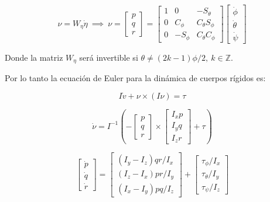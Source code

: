 \documentclass[../main.tex]{subfiles}
\begin{document}
\begin{equation}
\nu=W_{\eta}\dot{\eta}\ \implies\ \nu=\begin{bmatrix}p\\
q\\
r
\end{bmatrix}=\begin{bmatrix}1 & 0 & -S_{\theta}\\
0 & C_{\phi} & C_{\theta}S_{\phi}\\
0 & -S_{\phi} & C_{\theta}C_{\phi}
\end{bmatrix}\begin{bmatrix}\dot{\phi}\\
\dot{\theta}\\
\dot{\psi}
\end{bmatrix}\label{eq:138}
\end{equation}

Donde la matriz $W_{\eta}$ será invertible si $\theta\neq(2k-1)\phi/2,\ k\in\mathbb{Z}.$ 

Por lo tanto la ecuación de Euler para la dinámica de cuerpos rígidos
es:

\begin{equation}
I\dot{v}+\nu\times(I\nu)=\tau
\end{equation}

\begin{equation}
\dot{\nu}=I^{-1}\left(-\begin{bmatrix}p\\
q\\
r
\end{bmatrix}\times\begin{bmatrix}I_{x}p\\
I_{y}q\\
I_{z}r
\end{bmatrix}+\tau\right)
\end{equation}

\begin{equation}
\begin{bmatrix}\dot{p}\\
\dot{q}\\
\dot{r}
\end{bmatrix}=\begin{bmatrix}(I_{y}-I_{z})qr/I_{x}\\
(I_{z}-I_{x})pr/I_{y}\\
(I_{x}-I_{y})pq/I_{z}
\end{bmatrix}+\begin{bmatrix}\tau_{\phi}/I_{x}\\
\tau_{\theta}/I_{y}\\
\tau_{\psi}/I_{z}
\end{bmatrix}\label{eq:141}
\end{equation}
\end{document}
